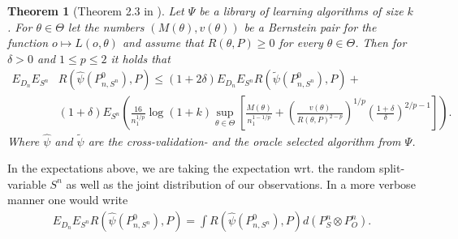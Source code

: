 \documentclass[11pt, a4paper]{article}
\newtheorem{theorem}{Theorem}
\theoremstyle{definition}
\theoremstyle{remark}
\newcommand{\ml}{k}
\newcommand{\btheta}{\theta}
\newcommand{\la}{\psi}
\newcommand{\Sn}{S^n}
\newcommand{\lib}{\Psi}
\begin{document}
\begin{theorem}[Theorem 2.3 in \parencite{vaart06}] \label{finitesample}
   Let $ \lib $ be a library of learning algorithms of size $ \ml $. For $ \btheta \in \Theta $ let the numbers $ (M(\btheta) , v(\btheta)) $ be a Bernstein pair for the function $ o \mapsto L(o, \btheta) $ and assume that $ R(\btheta, P) \geq 0 $ for every $ \btheta \in \Theta $. Then for $ \delta > 0 $ and $ 1 \leq p \leq 2 $ it holds that 
   \begin{align*}
       E_{D_n} E_{\Sn} &R(\hat{\la}(P_{n, \Sn}^{0}), P) \leq(1 + 2 \delta) E_{D_n} E_{\Sn} R( \tilde{\la}(P_{n,\Sn}^{0}), P) +\\
                       &(1 + \delta) E_{\Sn} \left(  \frac{16}{n_1^{1/p}} \log (1 +k) \sup_{\btheta \in \Theta} \left[ \frac{M(\btheta)}{n_1^{1-1/p}} +  \left( \frac{v(\btheta)}{R(\btheta, P)^{2-p}} \right)^{1/p} \left( \frac{1 + \delta}{\delta} \right)^{2/p-1} \right]\right).
   \end{align*}
   Where $ \hat{\la} $ and $ \tilde{\la} $ are the cross-validation- and the oracle selected algorithm from $ \lib $. 
\end{theorem}
In the expectations above, we are taking the expectation wrt. the random split-variable $ \Sn $ as well as the joint distribution of our observations. In a more verbose manner one would write 
\begin{align*}
     E_{D_n} E_{\Sn}  R(\hat{\la}(P_{n, \Sn}^{0}), P) = \int R(\hat{\la}(P_{n, \Sn}^{0}), P) d (P_\Sn \otimes  P^{n}_O ).
\end{align*}
\end{document}
